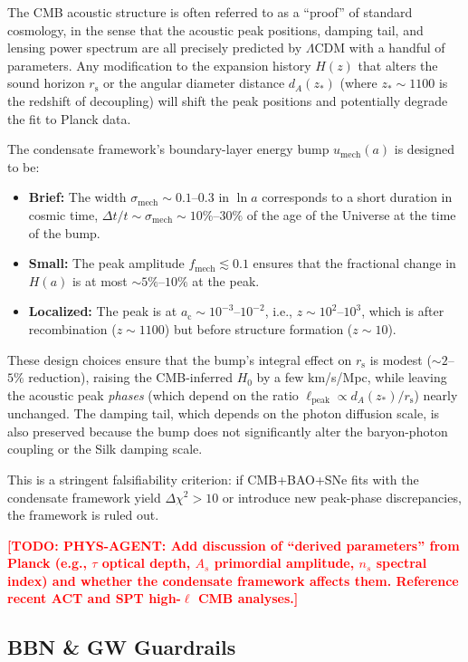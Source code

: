 \documentclass[11pt,a4paper]{article}
\newcommand{\ac}{a_{\mathrm{c}}}
\newcommand{\rs}{r_{\mathrm{s}}}
\newcommand{\sigmamech}{\sigma_{\mathrm{mech}}}
\newcommand{\fmech}{f_{\mathrm{mech}}}
\newcommand{\umech}{u_{\mathrm{mech}}}
\theoremstyle{definition}
\newcommand{\TODO}[1]{\textcolor{red}{\textbf{[TODO: #1]}}}
\begin{document}
The CMB acoustic structure is often referred to as a ``proof'' of standard cosmology, in the sense that the acoustic peak positions, damping tail, and lensing power spectrum are all precisely predicted by $\Lambda$CDM with a handful of parameters. Any modification to the expansion history $H(z)$ that alters the sound horizon $\rs$ or the angular diameter distance $d_A(z_*)$ (where $z_* \sim 1100$ is the redshift of decoupling) will shift the peak positions and potentially degrade the fit to Planck data.

The condensate framework's boundary-layer energy bump $\umech(a)$ is designed to be:
\begin{itemize}[leftmargin=1.8em]
  \item \textbf{Brief:} The width $\sigmamech \sim 0.1$--$0.3$ in $\ln a$ corresponds to a short duration in cosmic time, $\Delta t / t \sim \sigmamech \sim 10\%$--$30\%$ of the age of the Universe at the time of the bump.
  \item \textbf{Small:} The peak amplitude $\fmech \lesssim 0.1$ ensures that the fractional change in $H(a)$ is at most $\sim 5\%$--$10\%$ at the peak.
  \item \textbf{Localized:} The peak is at $\ac \sim 10^{-3}$--$10^{-2}$, i.e., $z \sim 10^2$--$10^3$, which is after recombination ($z \sim 1100$) but before structure formation ($z \sim 10$).
\end{itemize}

These design choices ensure that the bump's integral effect on $\rs$ is modest ($\sim 2$--$5\%$ reduction), raising the CMB-inferred $H_0$ by a few km/s/Mpc, while leaving the acoustic peak \emph{phases} (which depend on the ratio $\ell_{\mathrm{peak}} \propto d_A(z_*)/\rs$) nearly unchanged. The damping tail, which depends on the photon diffusion scale, is also preserved because the bump does not significantly alter the baryon-photon coupling or the Silk damping scale.

This is a stringent falsifiability criterion: if CMB+BAO+SNe fits with the condensate framework yield $\Delta\chi^2 > 10$ or introduce new peak-phase discrepancies, the framework is ruled out.

\TODO{PHYS-AGENT: Add discussion of ``derived parameters'' from Planck (e.g., $\tau$ optical depth, $A_s$ primordial amplitude, $n_s$ spectral index) and whether the condensate framework affects them. Reference recent ACT and SPT high-$\ell$ CMB analyses.}

\subsection{BBN \& GW Guardrails}
\label{sec:BBN_GW_guardrails}
\end{document}
